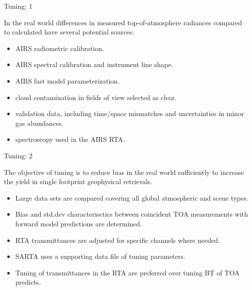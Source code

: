 \documentclass[10pt,t]{beamer}
\begin{document}
\begin{frame}{Tuning: 1}

  \begin{block}{}
    In the real world differences in measured top-of-atmosphere radiances compared to calculated have several potential sources:
  \end{block}
    
  \begin{itemize}
  \item AIRS radiometric calibration.
  \item AIRS spectral calibration and instrument line shape.
  \item AIRS fast model parameterization.
  \item cloud contamination in fields of view selected as clear.
  \item validation data, including time/space mismatches and uncertainties in minor gas abundances.
    \item spectroscopy used in the AIRS RTA.

  \end{itemize}

\end{frame}
\begin{frame}{Tuning: 2}

  \begin{block}{}
    The objective of tuning is to reduce bias in the real world sufficiently to increase the yield in single footprint geophysical retrievals.
  \end{block}

  \begin{itemize}
  \item Large data sets are compared covering all global atmospheric and scene types.
  \item Bias and std.dev characterisctics between coincident TOA measurements with forward model predictions are determined.
  \item RTA transmittances are adjusted for specific channels where needed.
  \item SARTA uses a supporting data file of tuning parameters.
  \item Tuning of transmittances in the RTA are preferred over tuning BT of TOA predicts.

  \end{itemize}

\end{frame}
\end{document}
